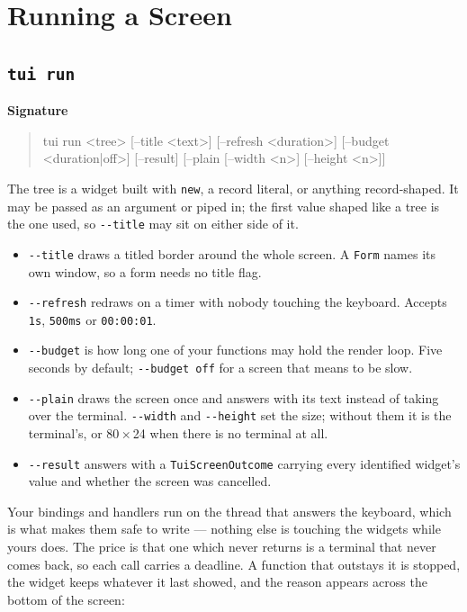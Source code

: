 \documentclass[11pt,a4paper,twoside,openany]{book}
\newcommand{\tosh}[1]{\lstinline[language=tosh]{#1}}
\newcommand{\code}[1]{\texttt{\small #1}}
\newenvironment{signature}{%
  \par\vspace{4pt}%
  \noindent\textbf{\sffamily\color{toshblue}Signature}\par\nopagebreak
  \begin{quote}\ttfamily\small
}{%
  \end{quote}\vspace{2pt}%
}
\begin{document}
\chapter{Running a Screen}

\section{\texttt{tui run}}

\begin{signature}
tui run <tree> [--title <text>] [--refresh <duration>]
              [--budget <duration|off>] [--result]
              [--plain [--width <n>] [--height <n>]]
\end{signature}

The tree is a widget built with \tosh{new}, a record literal, or anything
record-shaped. It may be passed as an argument or piped in; the first value shaped
like a tree is the one used, so \code{-{}-title} may sit on either side of it.

\begin{itemize}
  \item \code{-{}-title} draws a titled border around the whole screen. A
        \code{Form} names its own window, so a form needs no title flag.
  \item \code{-{}-refresh} redraws on a timer with nobody touching the keyboard.
        Accepts \tosh{1s}, \code{500ms} or \code{00:00:01}.
  \item \code{-{}-budget} is how long one of your functions may hold the render
        loop. Five seconds by default; \code{-{}-budget off} for a screen that means
        to be slow.
  \item \code{-{}-plain} draws the screen once and answers with its text instead of
        taking over the terminal. \code{-{}-width} and \code{-{}-height} set the
        size; without them it is the terminal's, or 80\,$\times$\,24 when there is
        no terminal at all.
  \item \code{-{}-result} answers with a \code{TuiScreenOutcome} carrying every
        identified widget's value and whether the screen was cancelled.
\end{itemize}

Your bindings and handlers run on the thread that answers the keyboard, which is what
makes them safe to write --- nothing else is touching the widgets while yours does.
The price is that one which never returns is a terminal that never comes back, so each
call carries a deadline. A function that outstays it is stopped, the widget keeps
whatever it last showed, and the reason appears across the bottom of the screen:
\end{document}
